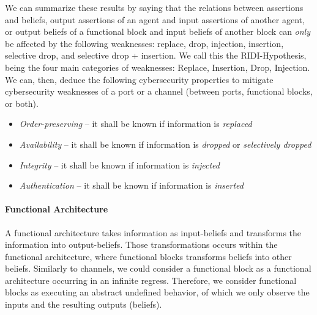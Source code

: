\documentclass[conference]{IEEEtran}
\begin{document}
We can summarize these results by saying that the relations between assertions
and beliefs, output assertions of an agent and input assertions of another
agent, or output beliefs of a functional block and input beliefs of another
block can \emph{only} be affected by the following weaknesses: replace, drop,
injection, insertion, selective drop, and selective drop + insertion. 
We call this the RIDI-Hypothesis, being the
four main categories of weaknesses: Replace, Insertion, Drop, Injection. We can,
then, deduce the following cybersecurity properties to mitigate cybersecurity weaknesses
of a port or a channel (between ports, functional blocks, or both).
\begin{itemize}
	\item \emph{Order-preserving} -- it shall be known if information is \emph{replaced}
	\item \emph{Availability} -- it shall be known if information is \emph{dropped} or \emph{selectively dropped}
	\item \emph{Integrity} -- it shall be known if information is \emph{injected}
	\item \emph{Authentication} -- it shall be known if information is \emph{inserted}
\end{itemize}



\paragraph{Functional Architecture}
A functional architecture takes information as input-beliefs and transforms the
information into output-beliefs. Those transformations occurs within the
functional architecture, where functional blocks transforms beliefs into other
beliefs. Similarly to channels, we could consider a functional block as a
functional architecture occurring in an infinite regress. Therefore, we
consider functional blocks as executing an abstract undefined behavior, of
which we only observe the inputs and the resulting outputs (beliefs).
\end{document}
